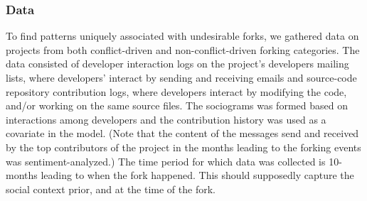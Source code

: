 \documentclass[12pt]{report}
\begin{document}
%
%                   
%
% 
%
%
%

\subsubsection{Data}
\label{DataCollection}

To find patterns uniquely associated with undesirable forks, we gathered data on projects from both conflict-driven and non-conflict-driven forking categories. The data consisted of developer interaction logs on the project's developers mailing lists, where developers' interact by sending and receiving emails and source-code repository contribution logs, where developers interact by modifying the code, and/or working on the same source files. The sociograms was formed based on interactions among developers and the contribution history was used as a covariate in the model. (Note that the content of the messages send and received by the top contributors of the project in the months leading to the forking events was sentiment-analyzed.) The time period for which data was collected is 10-months leading to when the fork happened. This should supposedly capture the social context prior, and at the time of the fork.
\end{document}
